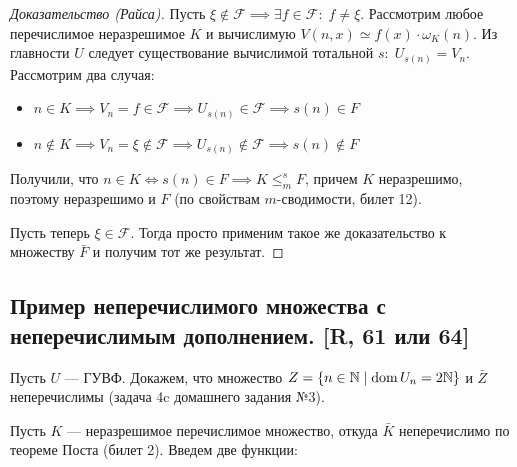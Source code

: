 \documentclass[a4paper, fleqn]{article}
\DeclareMathOperator{\dom}{\mathop{\mathrm{dom}}}
\newcommand{\mred}{\leqslant_m} %
\begin{document}
        \begin{proof}[Доказательство (Райса)]
            Пусть $\xi \notin \mathcal{F} \implies \exists f \in \mathcal{F}: \; f \ne \xi$. Рассмотрим любое перечислимое неразрешимое $K$ и вычислимую $V(n, x) \simeq f(x) \cdot \omega_K(n)$. Из главности $U$ следует существование вычислимой тотальной $s : \; U_{s(n)} = V_n$. Рассмотрим два случая:

            \begin{itemize}
                \item $n \in K \implies V_n = f \in \mathcal{F} \implies U_{s(n)} \in \mathcal{F} \implies s(n) \in F$

                \item $n \notin K \implies V_n = \xi \notin \mathcal{F} \implies U_{s(n)} \notin \mathcal{F} \implies s(n) \notin F$
            \end{itemize}

            Получили, что $n \in K \iff s(n) \in F \implies K \mred^s F$, причем $K$ неразрешимо, поэтому неразрешимо и $F$ (по свойствам $m$-сводимости, билет 12).

            Пусть теперь $\xi \in \mathcal{F}$. Тогда просто применим такое же доказательство к множеству $\bar F$ и получим тот же результат.
        \end{proof}

    \subsection{Пример неперечислимого множества с неперечислимым дополнением. [R, 61 или 64]}

        Пусть $U$ --- ГУВФ. Докажем, что множество $Z = \{n \in \NN \mid \dom U_n = 2\NN \}$ и $\bar Z$ неперечислимы (задача 4c домашнего задания №3).

        Пусть $K$ --- неразрешимое перечислимое множество, откуда $\bar K$ неперечислимо по теореме Поста (билет 2). Введем две функции:
\end{document}
